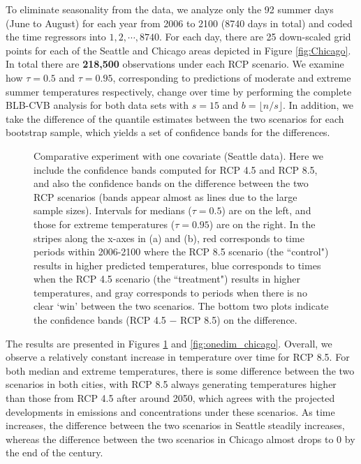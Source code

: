 \documentclass{statsoc}
\begin{document}
To eliminate seasonality from the data, we analyze only the 92 summer days (June to August) for each year from 2006 to 2100 (8740 days in total) and coded the time regressors into $1,2,\cdots, 8740$. For each day, there are 25 down-scaled grid points for each of the Seattle and Chicago areas depicted in Figure \ref{fig:Chicago}. In total there are {\bf 218,500} observations under each RCP scenario. We examine how $\tau=0.5$ and $\tau=0.95$, corresponding to predictions of moderate and extreme summer temperatures respectively, change over time by performing the complete BLB-CVB analysis for both data sets with $s=15$ and $ b=\lfloor n/s\rfloor$. In addition, we take the difference of the quantile estimates between the two scenarios for each bootstrap sample, which yields a set of confidence bands for the differences. 
\begin{figure}
\centering   
  
\caption{Comparative experiment with one covariate (Seattle data). Here we include the  confidence bands computed for RCP 4.5 and RCP 8.5, and also the confidence bands  {on} the difference between the two RCP scenarios (bands appear almost as lines due to the large sample sizes). Intervals for medians ($\tau=0.5$) are on the left, and those for extreme temperatures ($\tau=0.95$) are on the right. In the stripes along the x-axes in (a) and (b), red corresponds to time periods within 2006-2100 where the RCP 8.5 scenario (the ``control")  results in higher predicted temperatures, blue corresponds to times when the RCP 4.5 scenario (the ``treatment") results in higher temperatures, and gray corresponds to periods when there is no clear `win' between the two scenarios. The bottom two plots indicate the confidence bands (RCP 4.5 $-$ RCP 8.5) on the difference.}
\label{fig:onedim}
\end{figure}
The results are presented in Figures \ref{fig:onedim} and \ref{fig:onedim_chicago}. Overall, we observe a relatively constant increase in temperature over time for RCP 8.5. For both median and extreme temperatures, there is some difference between the two scenarios in both cities, with RCP 8.5 always generating temperatures higher than those from RCP 4.5 after around 2050, which agrees with the projected developments in emissions and concentrations under these scenarios. As time increases, the difference between the two scenarios in Seattle steadily increases, whereas the difference between the two scenarios in Chicago almost drops to 0 by the end of the century.
\end{document}
